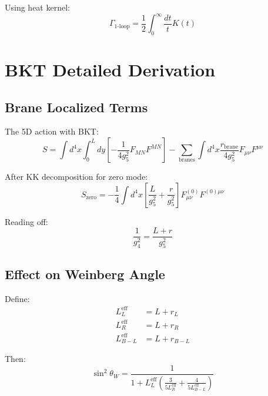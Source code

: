 \documentclass[11pt,a4paper]{article}
\begin{document}
Using heat kernel:
\begin{equation}
\label{eq:eff-action-heat}
\Gamma_{\text{1-loop}} = \frac{1}{2}\int_0^{\infty}\frac{dt}{t}K(t)
\end{equation}

\section{BKT Detailed Derivation}
\label{app:bkt-detail}

\subsection{Brane Localized Terms}
\label{app:bkt-localized}

The 5D action with BKT:
\begin{equation}
\label{eq:5d-bkt-action}
S = \int d^4x \int_0^L dy \left[-\frac{1}{4g_5^2}F_{MN}F^{MN}\right] - \sum_{\text{branes}}\int d^4x \frac{r_{\text{brane}}}{4g_5^2}F_{\mu\nu}F^{\mu\nu}
\end{equation}

After KK decomposition for zero mode:
\begin{equation}
\label{eq:zero-mode-action}
S_{\text{zero}} = -\frac{1}{4}\int d^4x \left[\frac{L}{g_5^2} + \frac{r}{g_5^2}\right]F_{\mu\nu}^{(0)}F^{(0)\mu\nu}
\end{equation}

Reading off:
\begin{equation}
\label{eq:g4-bkt-final}
\frac{1}{g_4^2} = \frac{L + r}{g_5^2}
\end{equation}

\subsection{Effect on Weinberg Angle}
\label{app:bkt-weinberg}

Define:
\begin{align}
\label{eq:eff-L-defs}
L_L^{\text{eff}} &= L + r_L \\
\label{eq:eff-R-defs}
L_R^{\text{eff}} &= L + r_R \\
\label{eq:eff-BL-defs}
L_{B-L}^{\text{eff}} &= L + r_{B-L}
\end{align}

Then:
\begin{equation}
\label{eq:sin2-eff-L}
\sin^2\theta_W = \frac{1}{1 + L_L^{\text{eff}}\left(\frac{3}{5 L_R^{\text{eff}}} + \frac{4}{5 L_{B-L}^{\text{eff}}}\right)}
\end{equation}
\end{document}

